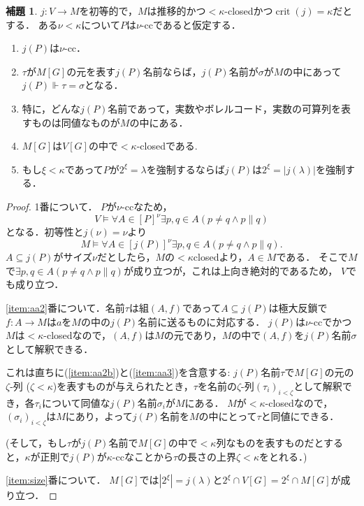 \documentclass[uplatex,dvipdfmx]{jsarticle}
\newcommand\forces{\Vdash}
\newcommand{\crit}{\operatorname{crit}}
\renewcommand\subset{\subseteq}
\theoremstyle{definition}
\newtheorem{lem}[thm]{補題}
\begin{document}
	\begin{lem}\label{lem:aa}
		$j \colon V \to M$を初等的で，$M$は推移的かつ${<}\kappa$-closedかつ$\crit(j) = \kappa$だとする．
		ある$\nu < \kappa$について$P$は$\nu$-ccであると仮定する．
		\begin{enumerate}
			\item\label{item:aa1} $j(P)$は$\nu$-cc．
			\item\label{item:aa2} $\tau$が$M[G]$の元を表す$j(P)$名前ならば，$j(P)$名前が$\sigma$が$M$の中にあって$j(P) \forces \tau=\sigma$となる．
			\item\label{item:aa2b}
			特に，どんな$j(P)$名前であって，実数やボレルコード，実数の可算列を表すものは同値なものが$M$の中にある．
			\item\label{item:aa3}  $M[G]$は$V[G]$の中で${<}\kappa$-closedである.
			\item\label{item:size} もし$\xi<\kappa$であって$P$が$2^\xi=\lambda$を強制するならば$j(P)$は$2^\xi=|j(\lambda)|$を強制する．
		\end{enumerate}
	\end{lem}
	\begin{proof}
		1番について．
		$P$が$\nu$-ccなため，
		\[
		V \models \forall A \in [P]^\nu \exists p, q \in A (p \ne q \land p \parallel q)
		\]
		となる．初等性と$j(\nu) = \nu$より
		\[
		M \models \forall A \in [j(P)]^\nu \exists p, q \in A (p \ne q \land p \parallel q).
		\]
		$A \subset j(P)$がサイズ$\nu$だとしたら，$M$の${<}\kappa$closedより，$A \in M$である．
		そこで$M$で$\exists p, q \in A (p \ne q \land p \parallel q)$が成り立つが，これは上向き絶対的であるため， $V$でも成り立つ．
				

	\ref{item:aa2}番について．名前$\tau$は組$(A,f)$であって$A\subseteq j(P)$は極大反鎖で$f \colon A\to M$は$a$を$M$の中の$j(P)$名前に送るものに対応する．
	$j(P)$は$\nu$-ccでかつ$M$は${<}\kappa$-closedなので，$(A,f)$は$M$の元であり，$M$の中で$(A,f)$を$j(P)$名前$\sigma$として解釈できる．
	
	これは直ちに(\ref{item:aa2b})と(\ref{item:aa3})を含意する: 
	$j(P)$名前$\tau$で$M[G]$の元の$\zeta$-列 ($\zeta<\kappa$)を表すものが与えられたとき，$\tau$を名前の$\zeta$-列$(\tau_i)_{i<\zeta}$として解釈でき，各$\tau_i$について同値な$j(P)$名前$\sigma_i$が$M$にある．
	$M$が${<}\kappa$-closedなので，$(\sigma_i)_{i<\zeta}$は$M$にあり，よって$j(P)$名前を$M$の中にとって$\tau$と同値にできる．
	
	(そして，もし$\tau$が$j(P)$名前で$M[G]$の中で${<}\kappa$列なものを表すものだとすると，$\kappa$が正則で$j(P)$が$\kappa$-ccなことから$\tau$の長さの上界$\zeta<\kappa$をとれる．)
	
	\ref{item:size}番について．
	$M[G]$では$|2^{\xi}|=j(\lambda)$と$2^{\xi}\cap V[G]=2^{\xi}\cap M[G]$が成り立つ．
	\end{proof}
\end{document}
